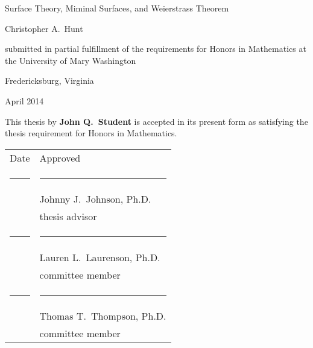 \documentclass[11pt]{article}
\theoremstyle{definition}
\begin{document}


\protect{\thispagestyle{empty}}

\begin{center}

\LARGE

\phantom{1}

\vspace{1.5in}

\sc Surface Theory, Miminal Surfaces, and Weierstrass Theorem \normalfont

\Large

\vspace{1.0in}

Christopher A.\ Hunt

\vfill

submitted in partial fulfillment of the requirements for Honors in Mathematics at the
University of Mary Washington

\vspace{0.5in}

Fredericksburg, Virginia

\vspace{0.5in}

April 2014

\normalsize

\vspace{1.0in}

\end{center}

\pagebreak



\protect{\thispagestyle{empty}}

\phantom{1}

\vspace{0.5in}

\noindent  This thesis by \textbf{John Q.\ Student} is accepted in its present form as satisfying the thesis requirement
for Honors in Mathematics.

\vspace{1.0in}


\begin{tabular}{p{1.0in}l}
\sc Date & \sc Approved \\[.65in]
\rule{0.85in}{0.5pt} & \rule{2.6in}{0.5pt}\\
& Johnny J.\ Johnson, Ph.D.\\    %
& thesis advisor\\[.65in]
\rule{0.85in}{0.5pt} & \rule{2.6in}{0.5pt}\\
& Lauren L.\ Laurenson, Ph.D.\\  %
& committee member\\[.65in]
\rule{0.85in}{0.5pt} & \rule{2.6in}{0.5pt}\\
& Thomas T.\ Thompson, Ph.D.\\   %
& committee member
\end{tabular}
\end{document}
